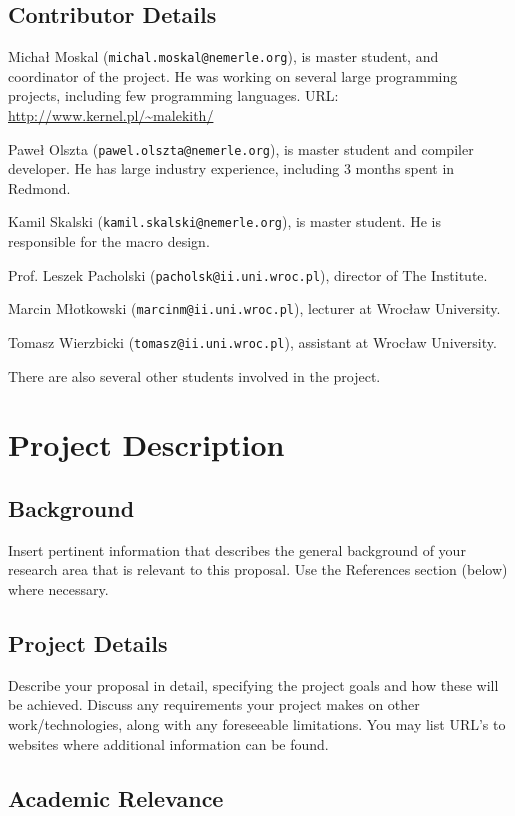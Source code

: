 \documentclass[a4paper,11pt]{article}
\begin{document}
\subsection{Contributor Details}

Micha{\l} Moskal (\texttt{michal.moskal@nemerle.org}), is master
student, and coordinator of the project. He was working on several large
programming projects, including few programming languages. URL: 
\url{http://www.kernel.pl/~malekith/}

Pawe{\l} Olszta (\texttt{pawel.olszta@nemerle.org}), is master student
and compiler developer. He has large industry experience, including
3 months spent in Redmond. 

Kamil Skalski (\texttt{kamil.skalski@nemerle.org}), is master student.
He is responsible for the macro design.

Prof. Leszek Pacholski (\texttt{pacholsk@ii.uni.wroc.pl}), director of The Institute.

Marcin M\l otkowski (\texttt{marcinm@ii.uni.wroc.pl}), lecturer at Wroc\l aw University.

Tomasz Wierzbicki (\texttt{tomasz@ii.uni.wroc.pl}), assistant at Wroc\l aw University.

There are also several other students involved in the project.


\section{Project Description}
\subsection{Background}
Insert pertinent information that describes the general background of
your research area that is relevant to this proposal. Use the References
section (below) where necessary.


\subsection{Project Details}

Describe your proposal in detail, specifying the project goals and how
these will be achieved. Discuss any requirements your project makes on
other work/technologies, along with any foreseeable limitations. You
may list URL's to websites where additional information can be found.


\subsection{Academic Relevance}
\end{document}
